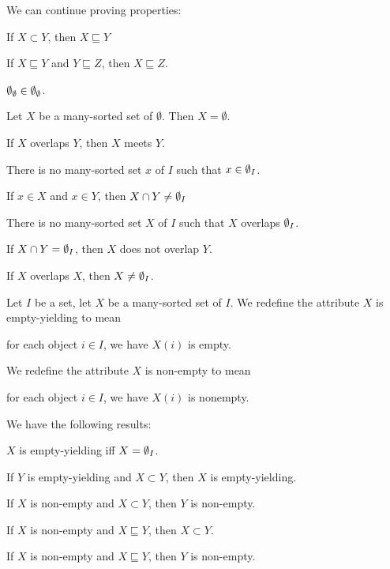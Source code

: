 \documentclass{article}
\begin{document}
We can continue proving properties:
\begin{thm}
\item\label{pboole:119} If $X \subset Y$, then $X \sqsubseteq Y$
\item\label{pboole:120} If $X \sqsubseteq Y$ and $Y \sqsubseteq Z$, then $X \sqsubseteq Z$.
\item\label{pboole:121} $\emptyset_{\emptyset}\in\emptyset_{\emptyset}$.
\item\label{pboole:122} Let $X$ be a many-sorted set of
  $\emptyset$. Then $X=\emptyset$.
\item\label{pboole:123} If $X$ overlaps $Y$, then $X$ meets $Y$.
\item\label{pboole:124} There is no many-sorted set $x$ of $I$ such that $x\in\emptyset_{I}$.
\item\label{pboole:125} If $x\in X$ and $x\in Y$, then
  $X \cap Y\neq\emptyset_{I}$
\item\label{pboole:126} There is no many-sorted set $X$ of $I$ such that
  $X$ overlaps $\emptyset_{I}$.
\item\label{pboole:127} If $X \cap Y = \emptyset_{I}$, then
  $X$ does not overlap $Y$.
\item\label{pboole:128} If $X$ overlaps $X$, then $X\neq\emptyset_{I}$.
\end{thm}

\begin{definition}
Let $I$ be a set, let $X$ be a many-sorted set of $I$.
We redefine the attribute $X$ is empty-yielding to mean
\begin{defn}
\item for each object $i\in I$, we have $X(i)$ is empty.
\end{defn}
We redefine the attribute $X$ is non-empty to mean
\begin{defn}
\item for each object $i\in I$, we have $X(i)$ is nonempty.
\end{defn}
\end{definition}

We have the following results:
\begin{thm}
\item\label{pboole:129} $X$ is empty-yielding iff $X = \emptyset_{I}$.
\item\label{pboole:130} If $Y$ is empty-yielding and $X\subset Y$, then
  $X$ is empty-yielding.
\item\label{pboole:131} If $X$ is non-empty and $X\subset Y$, then $Y$
  is non-empty.
\item\label{pboole:132} If $X$ is non-empty and $X \sqsubseteq Y$, then $X\subset Y$.
\item\label{pboole:133} If $X$ is non-empty and $X \sqsubseteq Y$, then $Y$ is non-empty.
\end{thm}
\end{document}
